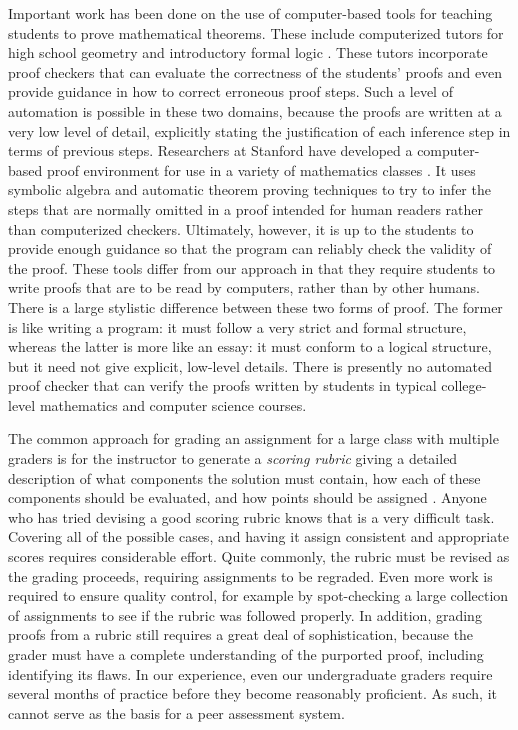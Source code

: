 \documentclass[12pt]{article}
\begin{document}
Important work has been done on the use of computer-based tools for
teaching students to prove mathematical theorems.
These include computerized tutors
for high school geometry \citep{anderson-ijcai85} and introductory formal
logic \citep{scheines-93,scheines-94}.  These tutors incorporate proof checkers
that can evaluate the correctness of the students' proofs and even
provide guidance in how to correct erroneous proof steps.  Such a level
of automation is possible in these two domains, because the proofs are
written at a very low level of detail, explicitly stating the
justification of each inference step in terms of previous steps.
Researchers at Stanford have
developed a computer-based proof environment for use in a variety of
mathematics classes \citep{sommer-jar04}.  It uses symbolic algebra and
automatic theorem proving techniques to try to infer the steps that
are normally omitted in a proof intended for human readers rather than
computerized checkers.  Ultimately, however, it is up to the students
to provide enough guidance so that the program can reliably check the
validity of the proof.  These tools differ from our approach in that
they require students to write proofs that are to be read by
computers, rather than by other humans.  There is a large stylistic
difference between these two forms of proof.  The former is like
writing a program: it must follow a very strict and formal structure,
whereas the latter is more like an essay: it must conform to a logical
structure, but it need not give explicit, low-level details.  There is
presently no automated proof checker that can verify the
proofs written by students in typical college-level
mathematics and computer science courses.

The common approach for grading an assignment for a large
class with multiple graders is for the instructor to generate a {\em
  scoring rubric} giving a detailed description of what components the
solution must contain, how each of these components should be
evaluated, and how points should be assigned
\citep{moskal-pa2000}.  Anyone who has tried devising a
good scoring rubric knows that is a very difficult task.  Covering all of the
possible cases, and having it assign consistent and appropriate scores
requires considerable effort.  Quite commonly, the rubric must be
revised as the grading proceeds, requiring assignments to be
regraded.  Even more work is required to ensure quality control, for
example by spot-checking a large collection of assignments to see if
the rubric was followed properly.
In addition, grading proofs from a rubric still requires a great deal of
sophistication, because the grader must have a complete understanding
of the purported proof, including identifying its flaws.
In our experience, even our 
undergraduate graders require several months of
practice before they become reasonably proficient.  As such, it cannot serve as
the basis for a peer assessment system.
\end{document}
